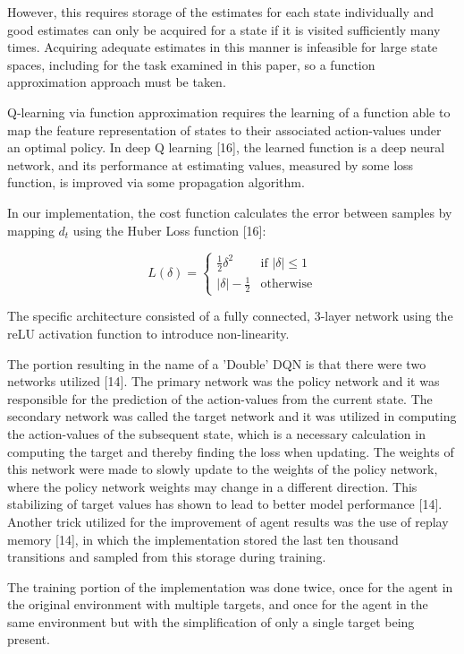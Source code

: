 \documentclass{article}
\begin{document}
	However, this requires storage of the estimates for each state individually and good estimates can only be acquired for a state if it is visited sufficiently many times. Acquiring adequate estimates in this manner is infeasible for large state spaces, including for the task examined in this paper, so a function approximation approach must be taken.
	
	Q-learning via function approximation requires the learning of a function able to map the feature representation of states to their associated action-values under an optimal policy. In deep Q learning [16], the learned function is a deep neural network, and its performance at estimating values, measured by some loss function, is improved via some propagation algorithm.
	
	In our implementation, the cost function calculates the error between samples by mapping $d_{t}$ using the Huber Loss function [16]:
	
	\begin{equation}
		L(\delta)=
		\begin{cases}
			\frac{1}{2}\delta^{2} & \text{if  } |\delta| \leq 1\\
			|\delta| - \frac{1}{2} & \text{otherwise} 
		\end{cases}
	\end{equation}
	
	The specific architecture consisted of a fully connected, 3-layer network using the reLU activation function to introduce non-linearity.
	
	The portion resulting in the name of a 'Double' DQN is that there were two networks utilized [14]. The primary network was the policy network and it was responsible for the prediction of the action-values from the current state. The secondary network was called the target network and it was utilized in computing the action-values of the subsequent state, which is a necessary calculation in computing the target and thereby finding the loss when updating. The weights of this network were made to slowly update to the weights of the policy network, where the policy network weights may change in a different direction. This stabilizing of target values has shown to lead to better model performance [14]. Another trick utilized for the improvement of agent results was the use of replay memory [14], in which the implementation stored the last ten thousand transitions and sampled from this storage during training.
	
	The training portion of the implementation was done twice, once for the agent in the original environment with multiple targets, and once for the agent in the same environment but with the simplification of only a single target being present.
	
\end{document}
